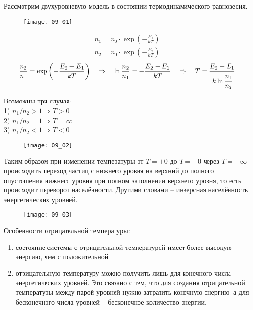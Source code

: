 
Рассмотрим двухуровневую модель в состоянии термодинамического равновесия.
\begin{figure}[h!]
	\center
	\texttt{[image: 09\_01]}
\end{figure}
\[
\begin{array}{c}
	n_1 = n_0 \cdot \exp\left( -\frac{E_1}{kT} \right) \\
    n_2 = n_0 \cdot \exp\left( -\frac{E_2}{kT} \right)
\end{array}
\]
\[
	\frac{n_2}{n_1} = \exp\left( -\frac{E_2-E_1}{kT} \right) 
    \quad \Rightarrow \quad
    \ln\frac{n_2}{n_1} = -\frac{E_2-E_1}{kT}
    \quad \Rightarrow \quad 
    T = \frac{E_2-E_1}{k\ln\cfrac{n_1}{n_2}}
\]

Возможны три случая:\\
1) \( n_1 / n_2 > 1 \Rightarrow T > 0 \) \\
2) \( n_1 / n_2 = 1 \Rightarrow T = \infty \) \\
3) \( n_1 / n_2 < 1 \Rightarrow T < 0 \) \\ 

\begin{figure}[h!]
	\center
	\texttt{[image: 09\_02]}
\end{figure}

Таким образом при изменении температуры от \( T = +0 \) до \( T = -0 \) через 
\( T = \pm\infty \) происходитъ переход частиц с нижнего уровня на верхний до 
полного опустошения нижнего уровня при полном заполнении верхнего уровня, то 
есть происходит переворот населённости. Другими словами -- инверсная 
населённость энергетических уровней.

\begin{figure}[h!]
	\center
	\texttt{[image: 09\_03]}
\end{figure}

Особенности отрицательной температуры:
\begin{enumerate}
	\item состояние системы с отрицательной температурой имеет более высокую 
    	энергию, чем с положительной 
    \item отрицательную температуру можно получить лишь для конечного числа 
    	энергетических уровней. Это связано с тем, что для создания 
    	отрицательной температуры между парой уровней нужно затратить конечную 
    	энергию, а для бесконечного числа уровней -- бесконечное количество 
    	энергии.
\end{enumerate}